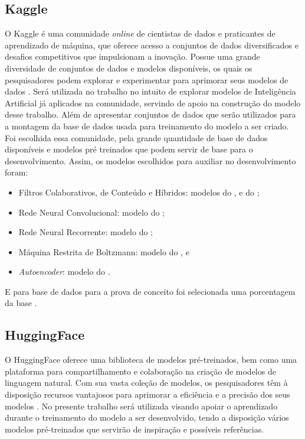 \subsection{Kaggle}\label{subsec:kaggle}
O Kaggle é uma comunidade \textit{online} de cientistas de dados e praticantes de aprendizado de máquina, que 
oferece acesso a conjuntos de dados diversificados e desafios competitivos que impulsionam a inovação. Possue 
uma grande diversidade de conjuntos de dados e modelos disponíveis, os quais os pesquisadores podem explorar e 
experimentar para aprimorar seus modelos de dados \cite{kagglesite}. Será utilizada no trabalho no intuito de explorar
modelos de Inteligência Artificial já aplicados na comunidade, servindo de apoio na construção do modelo desse trabalho.
Além de apresentar conjuntos de dados que serão utilizados para a montagem da base de dados usada para treinamento do modelo 
a ser criado. Foi escolhida essa comunidade, pela grande quantidade de base de dados disponíveis e modelos pré treinados que 
podem servir de base para o desenvolvimento.
Assim, os modelos escolhidos para auxiliar no desenvolvimento foram:
\begin{itemize}
    \item Filtros Colaborativos, de Conteúdo e Híbridos: modelos do , e do 
    ;
    \item Rede Neural Convolucional: modelo do ;
    \item Rede Neural Recorrente: modelo do ;
    \item Máquina Restrita de Boltzmann: modelo do , e
    \item \textit{Autoencoder}: modelo do .
\end{itemize}
E para base de dados para a prova de conceito
foi selecionada uma porcentagem da base .

\subsection{HuggingFace}\label{subsec:huggingface}
O HuggingFace oferece uma biblioteca de modelos pré-treinados, bem como uma plataforma para compartilhamento e 
colaboração na criação de modelos de linguagem natural. Com sua vasta coleção de modelos, os pesquisadores têm à 
disposição recursos vantajosos para aprimorar a eficiência e a precisão dos seus modelos \cite{huggingsite}. No presente trabalho será 
utilizada visando apoiar o aprendizado durante o treinamento do modelo a ser desenvolvido, tendo a disposição vários modelos
pré-treinados que servirão de inspiração e possíveis referências.


